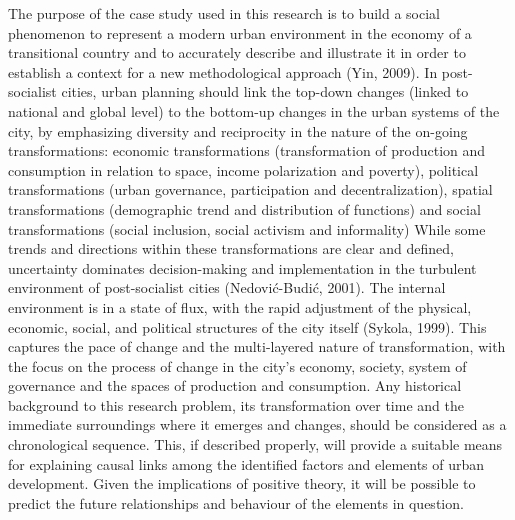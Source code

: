 \documentclass[11pt]{report}
\begin{document}
The purpose of the case study used in this research is to build a social phenomenon to represent a modern urban environment in the economy of a transitional country and to accurately describe and illustrate it in order to establish a context for a new methodological approach (Yin, 2009). 
In post-socialist cities, urban planning should link the top-down changes (linked to national and global level) to the bottom-up changes in the urban systems of the city, by emphasizing diversity and reciprocity in the nature of the on-going transformations: economic transformations (transformation of production and consumption in relation to space, income polarization and poverty), political transformations (urban governance, participation and decentralization), spatial transformations (demographic trend and distribution of functions) and social transformations (social inclusion, social activism and informality)
While some trends and directions within these transformations are clear and defined, uncertainty dominates decision-making and implementation in the turbulent environment of post-socialist cities (Nedović-Budić, 2001). The internal environment is in a state of flux, with the rapid adjustment of the physical, economic, social, and political structures of the city itself (Sykola, 1999). This captures the pace of change and the multi-layered nature of transformation, with the focus on the process of change in the city’s economy, society, system of governance and the spaces of production and consumption.
Any historical background to this research problem, its transformation over time and the immediate surroundings where it emerges and changes, should be considered as a chronological sequence. This, if described properly, will provide a suitable means for explaining causal links among the identified factors and elements of urban development. Given the implications of positive theory, it will be possible to predict the future relationships and behaviour of the elements in question.
\end{document}
